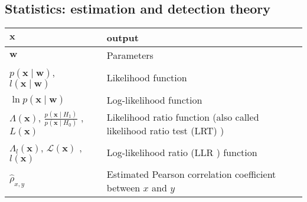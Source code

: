\subsection{Statistics: estimation and detection theory}
\begin{xltabular}{\textwidth}{XX}
    \(\mathbf{x}\) & output \\ \hline
    \(\mathbf{w}\) & Parameters \\ \hline
	\(p(\mathbf{x} \mid \mathbf{w})\), \(l(\mathbf{x} \mid \mathbf{w})\)\cite{leon-garciaProbabilityStatisticsRandom2007}                                                                                                                                                                                                & Likelihood function                                                                     \\ \hline
	\(\ln{p(\mathbf{x} \mid \mathbf{w})}\)                                                                                                                                                                                                                                                                           & Log-likelihood function                                                                                             \\ \hline
	\(\Lambda(\mathbf{x})\)\cite{leon-garciaProbabilityStatisticsRandom2007}, \(\frac{p(\mathbf{x} \mid H_1)}{p(\mathbf{x} \mid H_0)}\) \cite{leon-garciaProbabilityStatisticsRandom2007,kayFundamentalsStatisticalProcessing2009}, \(L(\mathbf{x})\) \cite{kayFundamentalsStatisticalProcessing2009,CharlesPES} & Likelihood ratio function (also called likelihood ratio test (LRT) \cite{kayFundamentalsStatisticalProcessing2009}) \\ \hline
	\(\Lambda_l(\mathbf{x})\), \(\mathcal{L}(\mathbf{x})\) \cite{CharlesPES}, \(l(\mathbf{x})\) \cite{kayFundamentalsStatisticalProcessing2009}                                                                                                                                                                  & Log-likelihood ratio (LLR \cite{kayFundamentalsStatisticalProcessing2009}) function                                 \\ \hline
	\(\hat{\rho}_{x,y}\)                                                                                                                                                                                                                                                                                         & Estimated Pearson correlation coefficient between \(x\) and \(y\)                                                   \\ \hline

\end{xltabular}
